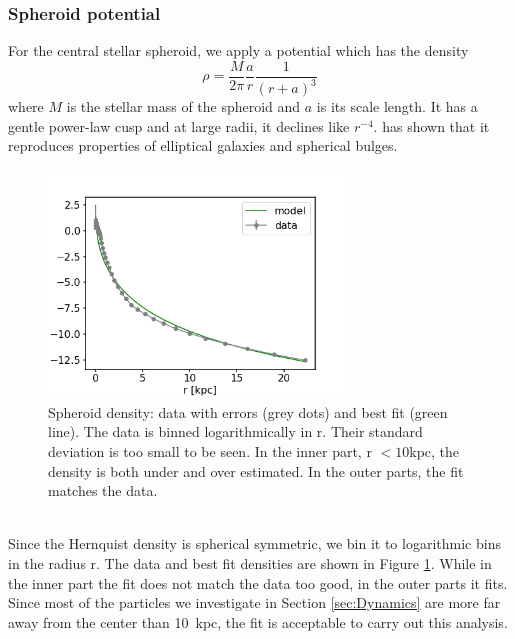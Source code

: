 \subsubsection{Spheroid potential}\label{subsubsec:spher_pot}
For the central stellar spheroid, we apply a \citet{Hernquistprofile} potential which has the density 
\begin{equation}
    \rho = \frac{M}{2\pi}\frac{a}{r}\frac{1}{(r+a)^3}
\end{equation}
where $M$ is the stellar mass of the spheroid and $a$ is its scale length. It has a gentle power-law cusp and at large radii, it declines like $r^{-4}$. \citet{Hernquistprofile} has shown that it reproduces properties of elliptical galaxies and spherical bulges. 
\\
\begin{figure}
\captionsetup{format=plain}
    \centering
    \includegraphics[width=0.7\textwidth]{plots/Auriga/spheroid_density_fit_snap_127.png}
    \caption{Spheroid density: data with errors (grey dots) and best fit (green line). The data is binned logarithmically in r. Their standard deviation is too small to be seen. In the inner part, r $<10$kpc, the density is both under and over estimated. In the outer parts, the fit matches the data.}
    \label{fig:spheroid_fit}
\end{figure}
\\Since the Hernquist density is spherical symmetric, we bin it to logarithmic bins in the radius r. The data and best fit densities are shown in Figure \ref{fig:spheroid_fit}. While in the inner part the fit does not match the data too good, in the outer parts it fits. Since most of the particles we investigate in Section \ref{sec:Dynamics} are more far away from the center than \SI{10}{kpc}, the fit is acceptable to carry out this analysis.

